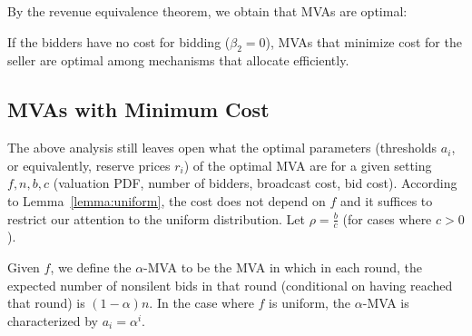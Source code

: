 By the revenue equivalence theorem,  we obtain that MVAs are optimal:

\begin{corollary}
If the bidders have no cost for bidding ($\beta_2=0$), MVAs 
that minimize cost for the seller
are optimal
among mechanisms that allocate efficiently.
\end{corollary}

\subsection{MVAs with Minimum Cost}
\label{sec:alpha-MVA}

The above analysis still leaves open what the optimal parameters
(thresholds $a_i$, or equivalently, reserve prices $r_i$) of the optimal
MVA are for a given setting $f, n, b, c$ (valuation PDF, number of bidders,
broadcast cost, bid cost).  According to Lemma~\ref{lemma:uniform}, the
cost does not depend on $f$ and it suffices to restrict our attention to
the uniform distribution.
Let $\rho = \frac{b}{c}$ (for cases where $c>0$).


\begin{definition}
Given $f$, we define the $\alpha$-MVA to be the MVA in which in each round, the expected
number of nonsilent bids in that round (conditional on having reached that
round) is $(1-\alpha)n$.  In the case where $f$ is uniform, the
$\alpha$-MVA is characterized by $a_i = \alpha^i$.
\end{definition}

